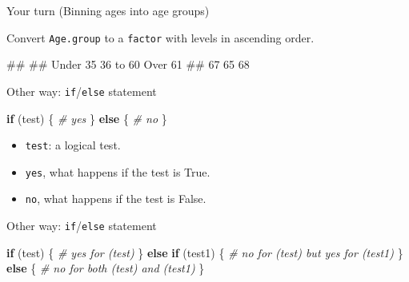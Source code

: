 \documentclass[ignorenonframetext,]{beamer}
\newenvironment{Shaded}{\begin{snugshade}}{\end{snugshade}}
\newcommand{\KeywordTok}[1]{\textcolor[rgb]{0.13,0.29,0.53}{\textbf{#1}}}
\newcommand{\DataTypeTok}[1]{\textcolor[rgb]{0.13,0.29,0.53}{#1}}
\newcommand{\StringTok}[1]{\textcolor[rgb]{0.31,0.60,0.02}{#1}}
\newcommand{\CommentTok}[1]{\textcolor[rgb]{0.56,0.35,0.01}{\textit{#1}}}
\newcommand{\ControlFlowTok}[1]{\textcolor[rgb]{0.13,0.29,0.53}{\textbf{#1}}}
\newcommand{\OperatorTok}[1]{\textcolor[rgb]{0.81,0.36,0.00}{\textbf{#1}}}
\newcommand{\NormalTok}[1]{#1}
\providecommand{\tightlist}{%
  \setlength{\itemsep}{0pt}\setlength{\parskip}{0pt}}
\let\oldShaded\Shaded
\let\endoldShaded\endShaded
\renewenvironment{Shaded}{\footnotesize\oldShaded}{\endoldShaded}
\let\oldverbatim\verbatim
\let\endoldverbatim\endverbatim
\renewenvironment{verbatim}{\footnotesize\oldverbatim}{\endoldverbatim}
\begin{document}
\begin{frame}[fragile]{Your turn (Binning ages into age groups)}

Convert \texttt{Age.group} to a \texttt{factor} with levels in ascending
order.

\begin{Shaded}
\end{Shaded}

\begin{verbatim}
## 
## Under 35 36 to 60  Over 61 
##       67       65       68
\end{verbatim}

\end{frame}

\begin{frame}[fragile]{Other way: \texttt{if}/\texttt{else} statement}

\begin{Shaded}
\begin{Highlighting}[]
\ControlFlowTok{if}\NormalTok{ (test) \{}
    \CommentTok{# yes}
\NormalTok{\} }\ControlFlowTok{else}\NormalTok{ \{}
    \CommentTok{# no}
\NormalTok{\}}
\end{Highlighting}
\end{Shaded}

\begin{itemize}
\tightlist
\item
  \texttt{test}: a logical test.
\item
  \texttt{yes}, what happens if the test is True.
\item
  \texttt{no}, what happens if the test is False.
\end{itemize}

\end{frame}

\begin{frame}[fragile]{Other way: \texttt{if}/\texttt{else} statement}

\begin{Shaded}
\begin{Highlighting}[]
\ControlFlowTok{if}\NormalTok{ (test) \{}
    \CommentTok{# yes for (test)}
\NormalTok{\} }\ControlFlowTok{else} \ControlFlowTok{if}\NormalTok{ (test1) \{}
    \CommentTok{# no for (test) but yes for (test1)}
\NormalTok{\} }\ControlFlowTok{else}\NormalTok{ \{}
    \CommentTok{# no for both (test) and (test1)}
\NormalTok{\}}
\end{Highlighting}
\end{Shaded}

\end{frame}
\end{document}
